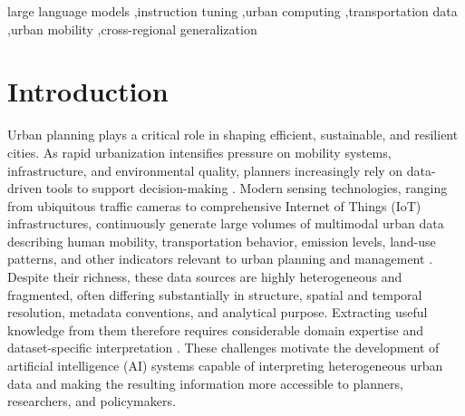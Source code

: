 \documentclass[a4paper,fleqn]{cas-sc}
\begin{document}
\begin{keywords}
large language models \sep instruction tuning \sep urban computing \sep transportation data \sep urban mobility \sep cross-regional generalization
\end{keywords}

\maketitle

\section{Introduction}\label{sec1}

Urban planning plays a critical role in shaping efficient, sustainable, and resilient cities. As rapid urbanization intensifies pressure on mobility systems, infrastructure, and environmental quality, planners increasingly rely on data-driven tools to support decision-making \cite{zheng2020urban, yeh2020urban}. Modern sensing technologies, ranging from ubiquitous traffic cameras to comprehensive Internet of Things (IoT) infrastructures, continuously generate large volumes of multimodal urban data describing human mobility, transportation behavior, emission levels, land-use patterns, and other indicators relevant to urban planning and management \cite{zhang2023urban, xu2022survey}. Despite their richness, these data sources are highly heterogeneous and fragmented, often differing substantially in structure, spatial and temporal resolution, metadata conventions, and analytical purpose. Extracting useful knowledge from them therefore requires considerable domain expertise and dataset-specific interpretation \cite{li2021survey, martinez2020data}. These challenges motivate the development of artificial intelligence (AI) systems capable of interpreting heterogeneous urban data and making the resulting information more accessible to planners, researchers, and policymakers.
\end{document}
